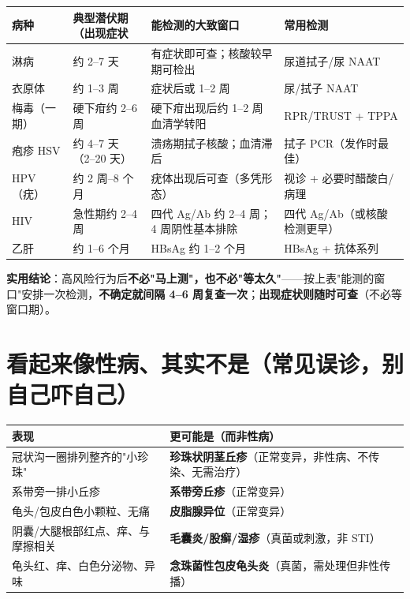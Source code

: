 \documentclass[12pt,UTF8,openany]{ctexbook}
\begin{document}
\begin{tabularx}{\textwidth}{l X X X}
\toprule
\textbf{病种} & \textbf{典型潜伏期（出现症状} & \textbf{能检测的大致窗口} & \textbf{常用检测} \\
\midrule
淋病 & 约 2--7 天 & 有症状即可查；核酸较早期可检出 & 尿道拭子/尿 NAAT \\
衣原体 & 约 1--3 周 & 症状后或 1--2 周 & 尿/拭子 NAAT \\
梅毒（一期） & 硬下疳约 2--6 周 & 硬下疳出现后约 1--2 周血清学转阳 & RPR/TRUST + TPPA \\
疱疹 HSV & 约 4--7 天（2--20 天） & 溃疡期拭子核酸；血清滞后 & 拭子 PCR（发作时最佳） \\
HPV（疣） & 约 2 周--8 个月 & 疣体出现后可查（多凭形态） & 视诊 + 必要时醋酸白/病理 \\
HIV & 急性期约 2--4 周 & 四代 Ag/Ab 约 2--4 周；4 周阴性基本排除 & 四代 Ag/Ab（或核酸检测更早） \\
乙肝 & 约 1--6 个月 & HBsAg 约 1--2 个月 & HBsAg + 抗体系列 \\
\bottomrule
\end{tabularx}

\vspace{0.5em}
\noindent\textbf{实用结论}：高风险行为后\textbf{不必"马上测"，也不必"等太久"}——按上表"能测的窗口"安排一次检测，\textbf{不确定就间隔 4--6 周复查一次}；\textbf{出现症状则随时可查}（不必等窗口期）。

\section{看起来像性病、其实不是（常见误诊，别自己吓自己）}

\begin{tabularx}{\textwidth}{l X}
\toprule
\textbf{表现} & \textbf{更可能是}（而非性病） \\
\midrule
冠状沟一圈排列整齐的"小珍珠" & \textbf{珍珠状阴茎丘疹}（正常变异，非性病、不传染、无需治疗） \\
系带旁一排小丘疹 & \textbf{系带旁丘疹}（正常变异） \\
龟头/包皮白色小颗粒、无痛 & \textbf{皮脂腺异位}（正常变异） \\
阴囊/大腿根部红点、痒、与摩擦相关 & \textbf{毛囊炎/股癣/湿疹}（真菌或刺激，非 STI） \\
龟头红、痒、白色分泌物、异味 & \textbf{念珠菌性包皮龟头炎}（真菌，需处理但非性传播） \\
\bottomrule
\end{tabularx}
\end{document}
